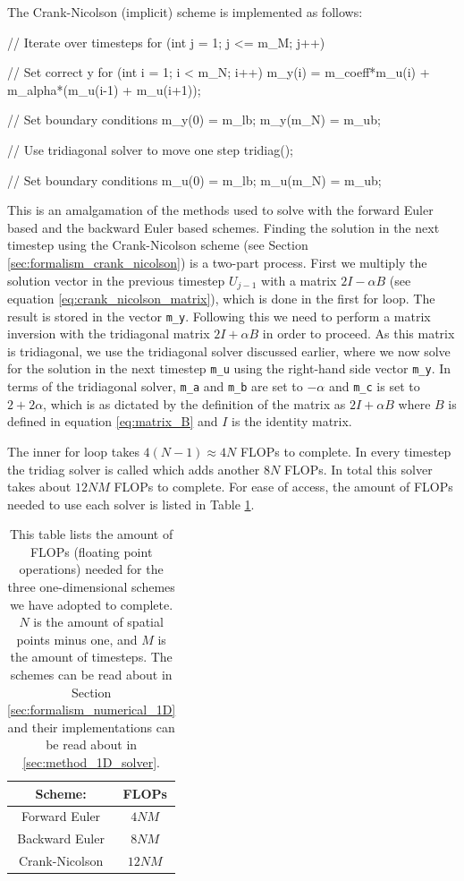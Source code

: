 \documentclass[reprint,english,notitlepage]{revtex4-1}  %
\begin{document}
The Crank-Nicolson (implicit) scheme is implemented as follows:

\begin{cpp}
// Iterate over timesteps
for (int j = 1; j <= m_M; j++){
  // Set correct y
  for (int i = 1; i < m_N; i++){
    m_y(i) = m_coeff*m_u(i) + m_alpha*(m_u(i-1) + m_u(i+1));
  }

  // Set boundary conditions
  m_y(0) = m_lb;
  m_y(m_N) = m_ub;

  // Use tridiagonal solver to move one step
  tridiag();

  // Set boundary conditions
  m_u(0) = m_lb;
  m_u(m_N) = m_ub;
}
\end{cpp}

This is an amalgamation of the methods used to solve with the forward Euler based and the backward Euler based schemes. Finding the solution in the next timestep using the Crank-Nicolson scheme (see Section \ref{sec:formalism_crank_nicolson}) is a two-part process. First we multiply the solution vector in the previous timestep $U_{j-1}$ with a matrix $2I - \alpha B$ (see equation \eqref{eq:crank_nicolson_matrix}), which is done in the first for loop. The result is stored in the vector \verb+m_y+. Following this we need to perform a matrix inversion with the tridiagonal matrix $2I + \alpha B$ in order to proceed. As this matrix is tridiagonal, we use the tridiagonal solver discussed earlier, where we now solve for the solution in the next timestep \verb+m_u+ using the right-hand side vector \verb+m_y+. In terms of the tridiagonal solver, \verb+m_a+ and \verb+m_b+ are set to $-\alpha$ and \verb+m_c+ is set to $2 + 2\alpha$, which is as dictated by the definition of the matrix as $2I + \alpha B$ where $B$ is defined in equation \eqref{eq:matrix_B} and $I$ is the identity matrix. 

The inner for loop takes $4(N-1) \approx 4N$ FLOPs to complete. In every timestep the tridiag solver is called which adds another $8N$ FLOPs. In total this solver takes about $12NM$ FLOPs to complete. For ease of access, the amount of FLOPs needed to use each solver is listed in Table \ref{table:FLOPs_1D}.

\begin{table}[H]
\centering
\caption{This table lists the amount of FLOPs (floating point operations) needed for the three one-dimensional schemes we have adopted to complete. $N$ is the amount of spatial points minus one, and $M$ is the amount of timesteps. The schemes can be read about in Section \ref{sec:formalism_numerical_1D} and their implementations can be read about in \ref{sec:method_1D_solver}.} \label{table:FLOPs_1D}
\begin{tabular}{|c|c|}
\hline 
Scheme: & FLOPs \\
\hline
Forward Euler & $4NM$ \\
\hline
Backward Euler & $8NM$ \\
\hline
Crank-Nicolson & $12NM$ \\
\hline
\end{tabular}
\end{table}
\end{document}

